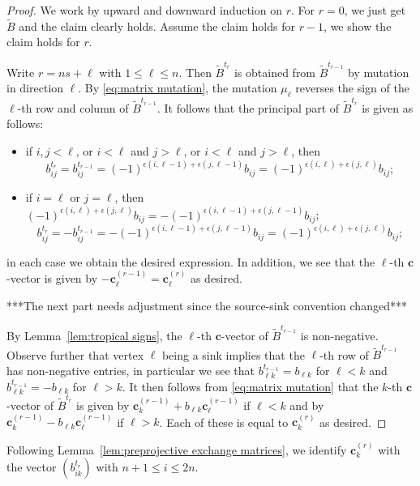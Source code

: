 \documentclass{amsart}
\newcommand{\sayDR}[1]{\say[DR]{\color{red}{\bf DR:}\;#1}}
\numberwithin{theorem}{section}
\newcommand{\bfc}{\boldsymbol{c}}
\begin{document}
  \begin{proof}
    We work by upward and downward induction on $r$.
    \sayDR{Downward case still needed}
    For $r=0$, we just get $\tilde B$ and the claim clearly holds.
    Assume the claim holds for $r-1$, we show the claim holds for $r$.

    Write $r=ns+\ell$ with $1 \le \ell \le n$.
    Then $\tilde B^{t_r}$ is obtained from $\tilde B^{t_{r-1}}$ by mutation in direction $\ell$.
    By \eqref{eq:matrix mutation}, the mutation $\mu_\ell$ reverses the sign of the $\ell$-th row and column of $\tilde B^{t_{r-1}}$.
    It follows that the principal part of $\tilde B^{t_r}$ is given as follows:
    \begin{itemize}
      \item if $i,j<\ell$, or $i<\ell$ and $j>\ell$, or $i<\ell$ and $j>\ell$, then 
        \[
          b^{t_r}_{ij}=b^{t_{r-1}}_{ij}=(-1)^{\epsilon(i,\ell-1)+\epsilon(j,\ell-1)}b_{ij}=(-1)^{\epsilon(i,\ell)+\epsilon(j,\ell)}b_{ij};
        \]
      \item if $i=\ell$ or $j=\ell$, then $(-1)^{\epsilon(i,\ell)+\epsilon(j,\ell)}b_{ij}=-(-1)^{\epsilon(i,\ell-1)+\epsilon(j,\ell-1)}b_{ij}$;
        \[
          b^{t_r}_{ij}=-b^{t_{r-1}}_{ij}=-(-1)^{\epsilon(i,\ell-1)+\epsilon(j,\ell-1)}b_{ij}=(-1)^{\epsilon(i,\ell)+\epsilon(j,\ell)}b_{ij};
        \]
    \end{itemize}
    in each case we obtain the desired expression.
    In addition, we see that the $\ell$-th $\bfc$-vector is given by $-\bfc^{(r-1)}_\ell=\bfc^{(r)}_\ell$ as desired.

    ***The next part needs adjustment since the source-sink convention changed***

    By Lemma~\ref{lem:tropical signs}, the $\ell$-th $\bfc$-vector of $\tilde B^{t_{r-1}}$ is non-negative.  
    Observe further that vertex $\ell$ being a sink implies that the $\ell$-th row of $\tilde B^{t_{r-1}}$ has non-negative entries, in particular we see that $b^{t_{r-1}}_{\ell k}=b_{\ell k}$ for $\ell<k$ and $b^{t_{r-1}}_{\ell k}=-b_{\ell k}$ for $\ell>k$.
    It then follows from \eqref{eq:matrix mutation} that the $k$-th $\bfc$-vector of $\tilde B^{t_r}$ is given by $\bfc^{(r-1)}_k+b_{\ell k}\bfc^{(r-1)}_\ell$ if $\ell<k$ and by $\bfc^{(r-1)}_k-b_{\ell k}\bfc^{(r-1)}_\ell$ if $\ell>k$.
    Each of these is equal to $\bfc^{(r)}_k$ as desired.
  \end{proof}

  Following Lemma~\ref{lem:preprojective exchange matrices}, we identify $\bfc^{(r)}_k$ with the vector $(b^{t_r}_{ik})$ with $n+1\le i\le 2n$.
\end{document}

